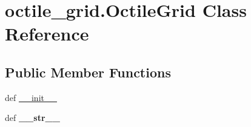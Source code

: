 \hypertarget{classoctile__grid_1_1_octile_grid}{}\section{octile\+\_\+grid.\+Octile\+Grid Class Reference}
\label{classoctile__grid_1_1_octile_grid}
\subsection*{Public Member Functions}
\begin{DoxyCompactItemize}
\item 
def \hyperlink{classoctile__grid_1_1_octile_grid_ae491afbb724305caae3fcc3654926519}{\+\_\+\+\_\+init\+\_\+\+\_\+}
\item 
\hypertarget{classoctile__grid_1_1_octile_grid_ad6eaffa12cd47c9eab3dc94d9a4bdea5}{}def {\bfseries \+\_\+\+\_\+str\+\_\+\+\_\+}\label{classoctile__grid_1_1_octile_grid_ad6eaffa12cd47c9eab3dc94d9a4bdea5}


\end{DoxyCompactItemize}
